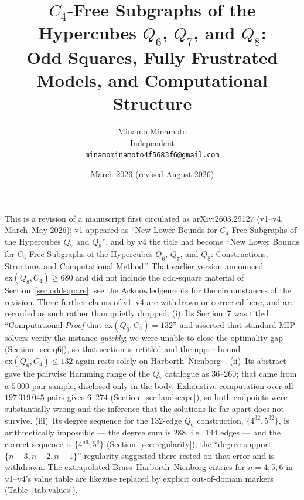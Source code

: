 \documentclass[12pt,a4paper]{article}
\title{\textbf{$C_4$-Free Subgraphs of the Hypercubes $Q_6$, $Q_7$, and $Q_8$:\\
Odd Squares, Fully Frustrated Models, and Computational Structure}}
\author{Minamo Minamoto\\[4pt]
\small Independent\\
\small \texttt{minamominamoto4f5683f6@gmail.com}}
\date{March 2026 (revised August 2026)}
\theoremstyle{definition}
\newcommand{\ex}{\mathrm{ex}}
\begin{document}
\maketitle

\begin{center}
\small This is a revision of a manuscript first circulated as
arXiv:2603.29127 (v1--v4, March--May 2026); v1 appeared as
``New Lower Bounds for $C_4$-Free Subgraphs of the Hypercubes $Q_7$ and
$Q_8$'', and by v4 the title had become
``New Lower Bounds for $C_4$-Free Subgraphs of the Hypercubes $Q_6$,
$Q_7$, and $Q_8$: Constructions, Structure, and Computational
Method.'' That earlier version announced $\ex(Q_8,C_4)\ge680$ and did
not include the odd-square material of Section~\ref{sec:oddsquare};
see the Acknowledgements for the circumstances of the revision.
Three further claims of v1--v4 are withdrawn or corrected here, and are
recorded as such rather than quietly dropped.
(i)~Its Section~7 was titled ``Computational \emph{Proof} that
$\ex(Q_6,C_4)=132$'' and asserted that standard MIP solvers verify the
instance \emph{quickly}; we were unable to close the optimality gap
(Section~\ref{sec:q6}), so that section is retitled and the upper bound
$\ex(Q_6,C_4)\le132$ again rests solely on Harborth--Nienborg~\cite{HN94}.
(ii)~Its abstract gave the pairwise Hamming range of the $Q_7$ catalogue as
$36$--$260$; that came from a $5\,000$-pair sample, disclosed only in the body.
Exhaustive computation over all $197\,319\,045$ pairs gives $6$--$274$
(Section~\ref{sec:landscape}), so both endpoints were substantially wrong and
the inference that the solutions lie far apart does not survive.
(iii)~Its degree sequence for the $132$-edge $Q_6$ construction,
$\{4^{32},5^{32}\}$, is arithmetically impossible --- the degree sum is $288$,
i.e.\ $144$ edges --- and the correct sequence is $\{4^{56},5^{8}\}$
(Section~\ref{sec:regularity}); the ``degree support $\{n-3,n-2,n-1\}$''
regularity suggested there rested on that error and is withdrawn. The
extrapolated Brass--Harborth--Nienborg entries for $n=4,5,6$ in v1--v4's
value table are likewise replaced by explicit out-of-domain markers
(Table~\ref{tab:values}).
\end{center}
\medskip
\end{document}
